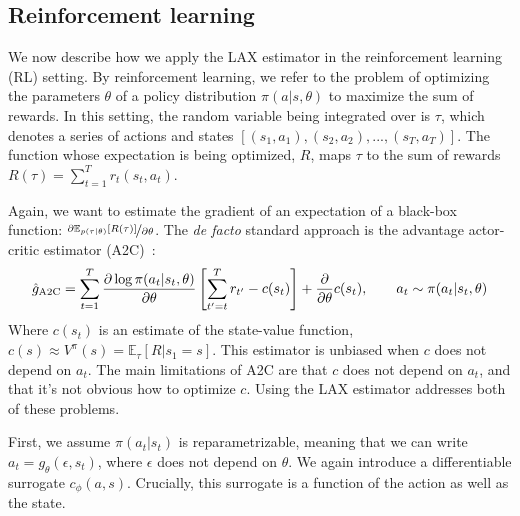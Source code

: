 \documentclass{article}
\newcommand{\E}{\mathbb{E}}
\newcommand{\LL}[1]{\frac{\partial \log \pi(a_{#1}| s_{#1}, \theta)}{\partial \theta}}
\newcommand{\LAX}{{\textnormal{LAX}}}
\begin{document}
\subsection{Reinforcement learning}
We now describe how we apply the \LAX{} estimator in the reinforcement learning (RL) setting.
By reinforcement learning, we refer to the problem of optimizing the parameters $\theta$ of a policy distribution $\pi(a | s, \theta)$ to maximize the sum of rewards.
In this setting, the random variable being integrated over is $\tau$, which denotes a series of actions and states $[(s_1, a_1), (s_2, a_2), ..., (s_T, a_T)]$.
The function whose expectation is being optimized, $R$, maps $\tau$ to the sum of rewards ${R(\tau) = \sum_{t=1}^{T} r_t(s_t, a_t)}$.

Again, we want to estimate the gradient of an expectation of a black-box function: $\nicefrac{\partial \mathbb{E}_{p(\tau|\theta)}[R(\tau)]}{\partial \theta}$.
The \emph{de facto} standard approach is the advantage actor-critic estimator (A2C)~\citep{sutton2000policy}:%
%
%
%
%
%
%
\begin{align}
\hat g_{\textnormal{A2C}} = \sum_{t=1}^T \LL{t} \left[ \sum_{t'=t}^T r_{t'} - c(s_t) \right]+\frac{\partial}{\partial\theta} c(s_t), \qquad a_t \sim \pi(a_t | s_t, \theta)
\label{eq:rl_a2c}
\end{align}
%
Where $c(s_t)$ is an estimate of the state-value function, $c(s) \approx V^\pi(s) = \E_{\tau}[R|s_1=s].$
This estimator is unbiased when $c$ does not depend on $a_t$.
The main limitations of A2C are that $c$ does not depend on $a_t$, and that it's not obvious how to optimize $c$.
Using the \LAX{} estimator addresses both of these problems.

First, we assume $\pi(a_t|s_t)$ is reparametrizable, meaning that we can write $a_t = g_\theta(\epsilon,s_t)$, where $\epsilon$ does not depend on $\theta$.
We again introduce a differentiable surrogate $c_\phi(a,s)$.
Crucially, this surrogate is a function of the action as well as the state.
\end{document}
